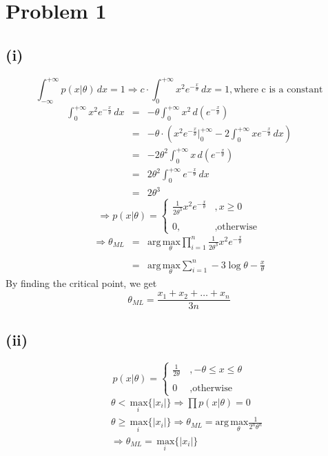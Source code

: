 \documentclass[twoside,11pt]{homework}
\begin{document}
\maketitle

\section*{Problem 1}
\subsection*{(i)}
$$ \int_{-\infty}^{+\infty} p(x|\theta) \,dx = 1
\Rightarrow c \cdot\int_{0}^{+\infty} x^{2}e^{-\frac{x}{\theta}} \,dx = 1, 
\mbox{where c is a constant}
$$
\begin{eqnarray*}
\int_{0}^{+\infty} x^{2}e^{-\frac{x}{\theta}} \,dx
&=& -\theta\int_{0}^{+\infty} x^{2}\,d(e^{-\frac{x}{\theta}})\\
&=& -\theta\cdot(x^{2}e^{-\frac{x}{\theta}}\big|_{0}^{+\infty} - 2\int_{0}^{+\infty}xe^{-\frac{x}{\theta}} \,dx)\\
&=& -2\theta^{2}\int_0^{+\infty}x\,d(e^{-\frac{x}{\theta}})\\
&=& 2\theta^2\int_0^{+\infty}e^{-\frac{x}{\theta}}\,dx\\
&=& 2\theta^3
\end{eqnarray*}
$$\Rightarrow p(x|\theta) = \begin{cases}
\frac{1}{2\theta^3}x^2e^{-\frac{x}{\theta}} &,x \geqslant 0\\\\
0, &,\mbox{otherwise}
\end{cases}$$
\begin{eqnarray*}
\Rightarrow \theta_{ML} &=& \mathrm{arg}\underset{\theta}{\mathrm{\,max}}
\prod_{i=1}^{n}\frac{1}{2\theta^3}x^2e^{-\frac{x}{\theta}}\\\\
&=& \mathrm{arg}\underset{\theta}{\mathrm{\,max}}
\sum_{i=1}^{n} -3\log\theta-\frac{x}{\theta}
\end{eqnarray*}
By finding the critical point, we get
$$\theta_{ML} = \frac{x_1+x_2+\ldots+x_n}{3n}$$

\subsection*{(ii)}
$$p(x|\theta) = \begin{cases}
\frac{1}{2\theta}\,&,-\theta\leqslant x\leqslant \theta\\\\
0&\mbox{,otherwise}
\end{cases}$$
\begin{eqnarray*}
&&\theta < \underset{i}{\mathrm{\,max}}\big\{ |x_i|\big\} 
\Rightarrow \prod p(x|\theta) = 0\\
&&\theta \geqslant \underset{i}{\mathrm{\,max}}\big\{ |x_i|\big\} 
\Rightarrow \theta_{ML} = \mathrm{arg}\underset{\theta}{\mathrm{\,max}}\frac{1}{2^n\theta^n}\\
&&\Rightarrow \theta_{ML} = \underset{i}{\mathrm{\,max}}\big\{ |x_i|\big\}
\end{eqnarray*}
\end{document}
